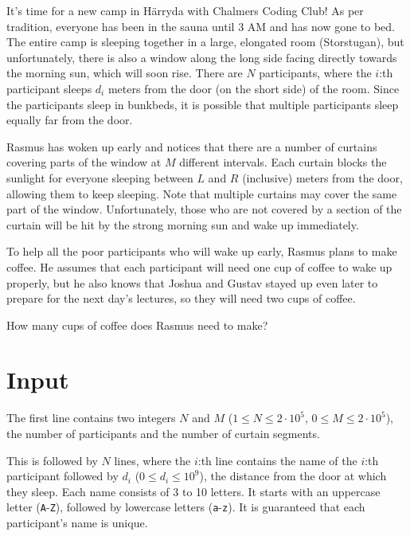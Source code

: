 \noindent

It's time for a new camp in Härryda with Chalmers Coding Club! As per tradition, everyone has been in
the sauna until 3 AM and has now gone to bed. The entire camp is sleeping together in a large, elongated
room (Storstugan), but unfortunately, there is also a window along the long side facing directly towards
the morning sun, which will soon rise. There are $N$ participants, where the $i$:th participant sleeps
$d_i$ meters from the door (on the short side) of the room. Since the participants sleep in bunkbeds,
it is possible that multiple participants sleep equally far from the door.


Rasmus has woken up early and notices that there are a number of curtains covering parts of the window
at $M$ different intervals. Each curtain blocks the sunlight for everyone sleeping between $L$ and $R$ (inclusive)
meters from the door, allowing them to keep sleeping. Note that multiple curtains may cover the same part of the window.
Unfortunately, those who are not covered by a section of the curtain will be hit by the strong morning sun and wake up immediately.

To help all the poor participants who will wake up early, Rasmus plans to make coffee. He assumes that each participant will
need one cup of coffee to wake up properly, but he also knows that Joshua and Gustav stayed up even later to prepare
for the next day's lectures, so they will need two cups of coffee.

How many cups of coffee does Rasmus need to make?

\section*{Input}
The first line contains two integers $N$ and $M$ ($1 \leq N \leq 2 \cdot 10^5$, $0 \leq M \leq 2 \cdot 10^5$),
the number of participants and the number of curtain segments.

This is followed by $N$ lines, where the $i$:th line contains the name of the $i$:th participant followed by $d_i$ ($0 \leq d_i \leq 10^9$),
the distance from the door at which they sleep. Each name consists of 3 to 10 letters. It starts with an uppercase letter (\texttt{A}-\texttt{Z}),
followed by lowercase letters (\texttt{a}-\texttt{z}). It is guaranteed that each participant's name is unique.

